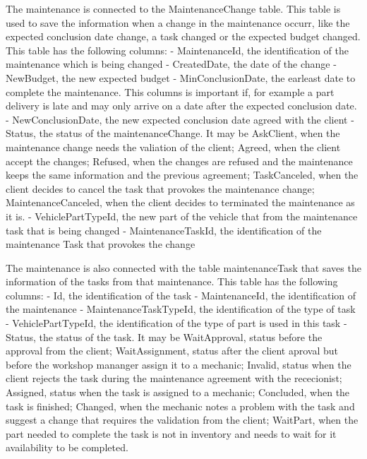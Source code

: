 The maintenance is connected to the MaintenanceChange table. This table is used to save the information when a change in the maintenance occurr, like the expected conclusion date change, a task changed or the expected budget changed.
This table has the following columns:
- MaintenanceId, the identification of the maintenance which is being changed
- CreatedDate, the date of the change
- NewBudget, the new expected budget
- MinConclusionDate, the earleast date to complete the maintenance. This columns is important if, for example a part delivery is late and may only arrive on a date after the expected conclusion date.
- NewConclusionDate, the new expected conclusion date agreed with the client
- Status, the status of the maintenanceChange. It may be AskClient, when the maintenance change needs the valiation of the client; Agreed, when the client accept the changes; Refused, when the changes are refused and the maintenance keeps the same information and the previous agreement; TaskCanceled, when the client decides to cancel the task that provokes the maintenance change; MaintenanceCanceled, when the client decides to terminated the maintenance as it is.
- VehiclePartTypeId, the new part of the vehicle that from the maintenance task that is being changed
- MaintenanceTaskId, the identification of the maintenance Task that provokes the change

The maintenance is also connected with the table maintenanceTask that saves the information of the tasks from that maintenance.
This table has the following columns:
- Id, the identification of the task
- MaintenanceId, the identification of the maintenance
- MaintenanceTaskTypeId, the identification of the type of task
- VehiclePartTypeId, the identification of the type of part is used in this task
- Status, the status of the task. It may be WaitApproval, status before the approval from the client; WaitAssignment, status after the client aproval but before the workshop mananger assign it to a mechanic; Invalid, status when the client rejects the task during the maintenance agreement with the rececionist; Assigned, status when the task is assigned to a mechanic; Concluded, when the task is finished; Changed, when the mechanic notes a problem with the task and suggest a change that requires the validation from the client; WaitPart, when the part needed to complete the task is not in inventory and needs to wait for it availability to be completed.


